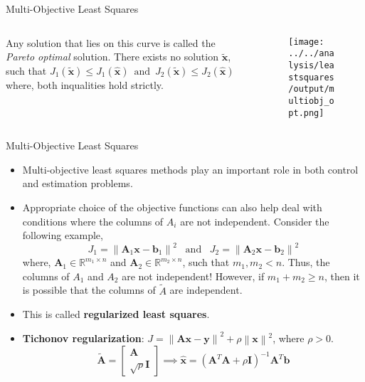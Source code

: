 \documentclass[aspectratio=169]{beamer}
\let\olditem\item
\renewcommand{\item}{\setlength{\itemsep}{\fill}\olditem}
\begin{document}
\begin{frame}[t]{Multi-Objective Least Squares}
    \begin{columns}
        \begin{column}{0.3\textwidth}
        {\small Any solution that lies on this curve is called the \textit{Pareto optimal} solution. There exists no solution $\tilde{\mathbf{x}}$, such that $J_1\left(\tilde{\mathbf{x}}\right) \leq J_1\left(\hat{\mathbf{x}}\right) \,\,\, \text{and} \,\,\, J_2\left(\tilde{\mathbf{x}}\right) \leq J_2\left(\hat{\mathbf{x}}\right)$ where, both inqualities hold strictly.}
        \end{column}
        
        \begin{column}{0.65\textwidth}
        \begin{figure}
            \centering
            \texttt{[image: ../../analysis/leastsquares/output/multiobj\_opt.png]}
        \end{figure}
    \end{column}
    \end{columns}
\end{frame}


\begin{frame}[t]{Multi-Objective Least Squares}
\begin{small}
\begin{itemize}
    \item Multi-objective least squares methods play an important role in both control and estimation problems.
    
    \item Appropriate choice of the objective functions can also help deal with conditions where the columns of $A_i$ are not independent. Consider the following example,
    \[ J_1 = \left\lVert \mathbf{A}_1\mathbf{x} - \mathbf{b}_1 \right\rVert^2 \,\,\, \text{ and } \,\,\, J_2 = \left\lVert \mathbf{A}_2\mathbf{x} - \mathbf{b}_2\right\rVert^2 \]
    where, $\mathbf{A}_1 \in \mathbb{R}^{m_1 \times n}$ and $\mathbf{A}_2 \in \mathbb{R}^{m_2 \times n}$, such that $m_1, m_2 < n$. Thus, the columns of $A_1$ and $A_2$ are not independent!
    However, if $m_1 + m_2 \geq n$, then it is possible that the columns of $\tilde{A}$ are independent.

    \item This is called \textbf{regularized least squares}.

    \item \textbf{Tichonov regularization}: $J = \left\lVert \mathbf{Ax} - \mathbf{y}\right\rVert^2 + \rho \left\lVert \mathbf{x} \right\rVert^2$, where $\rho > 0$.
    \[ \mathbf{\tilde{A}} = \begin{bmatrix*}\mathbf{A}\\\sqrt{\rho}\mathbf{I}\end{bmatrix*} \implies \hat{\mathbf{x}} =  \left(\mathbf{A}^T\mathbf{A} + \rho \mathbf{I}\right)^{-1}\mathbf{A}^T\mathbf{b} \]
\end{itemize}
\end{small}
\end{frame}
\end{document}
